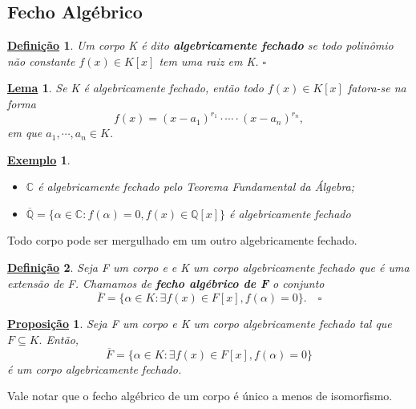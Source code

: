 \documentclass{article}
\newtheorem*{def*}{\underline{Defini\c c\~ao}}
\newtheorem*{lemma*}{\underline{Lema}}
\newtheorem*{prop*}{\underline{Proposi\c c\~ao}}
\newtheorem{example}{\underline{Exemplo}}
\begin{document}
\subsection{Fecho Algébrico}
\begin{def*}
  Um corpo K é dito \textbf{algebricamente fechado} se todo polinômio não constante \(f(x)\in K[x]\) tem
  uma raiz em K. \(\square\)
\end{def*}
\begin{lemma*}
  Se K é algebricamente fechado, então todo \(f(x)\in K[x]\) fatora-se na forma 
  \[
    f(x) = (x-a_{1})^{r_{1}}\cdot \cdots \cdot (x-a_{n})^{r_{n}},
  \]
  em que \(a_{1}, \cdots, a_{n}\in K\).
\end{lemma*}
\begin{example}
  \begin{itemize}
    \item[1)] \(\mathbb{C}\) é algebricamente fechado pelo Teorema Fundamental da Álgebra;
    \item[2)] \(\overline{\mathbb{Q}} = \{\alpha \in \mathbb{C}: f(\alpha ) = 0, f(x)\in \mathbb{Q}[x]\}\) é algebricamente fechado
  \end{itemize}
\end{example}
Todo corpo pode ser mergulhado em um outro algebricamente fechado.
\begin{def*}
  Seja F um corpo e e K um corpo algebricamente fechado que é uma extensão de F. Chamamos de
  \textbf{fecho algébrico de F} o conjunto 
  \[
    \overline{F} = \{\alpha \in K: \exists f(x)\in F[x], f(\alpha ) = 0\}.\quad\square
  \]
\end{def*}
\begin{prop*}
  Seja F um corpo e K um corpo algebricamente fechado tal que \(F \subseteq{K}.\) Então, 
  \[
    \overline{F} = \{\alpha \in K: \exists f(x)\in F[x], f(\alpha ) = 0\}
  \]
  é um corpo algebricamente fechado.
\end{prop*}
Vale notar que o fecho algébrico de um corpo é único a menos de isomorfismo.
\end{document}
